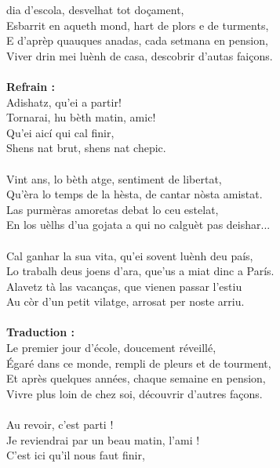 
 dia d’escola, desvelhat tot doçament,
\\Esbarrit en aqueth mond, hart de plors e de turments,
\\E d'aprèp quauques anadas, cada setmana en pension,
\\Viver drin mei luènh de casa, descobrir d’autas faiçons.
\\\\\textbf{Refrain :}
\\Adishatz, qu’ei a partir!
\\Tornarai, hu bèth matin, amic!
\\Qu’ei aicí qui cal finir,
\\Shens nat brut, shens nat chepic.
\\\\Vint ans, lo bèth atge, sentiment de libertat,
\\Qu’èra lo temps de la hèsta, de cantar nòsta amistat.
\\Las purmèras amoretas debat lo ceu estelat,
\\En los uèlhs d’ua gojata a qui no calguèt pas deishar...
\\\\Cal ganhar la sua vita, qu’ei sovent luènh deu país,
\\Lo trabalh deus joens d'ara, que'us a miat dinc a París.
\\Alavetz tà las vacanças, que vienen passar l’estiu
\\Au còr d’un petit vilatge, arrosat per noste arriu.
\\\\\textbf{Traduction : }
\\Le premier jour d'école, doucement réveillé,
\\Égaré dans ce monde, rempli de pleurs et de tourment,
\\Et après quelques années, chaque semaine en pension,
\\Vivre plus loin de chez soi, découvrir d'autres façons.
\\\\Au revoir, c'est parti !
\\Je reviendrai par un beau matin, l'ami !
\\C'est ici qu'il nous faut finir,

